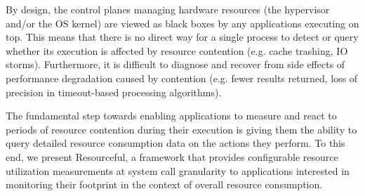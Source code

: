\documentclass[letterpaper,twocolumn,10pt]{article}
\newcommand{\pname}{Resourceful}
\newcommand{\lnote}[1]{\textcolor{red}{[\textit{#1}]}} %
\begin{document}
By design, the control planes managing hardware resources (the hypervisor and/or
the OS kernel) are viewed as black boxes by any applications executing on top.
This means that there is no direct way for a single process to detect or query
whether its execution is affected by resource contention (e.g. cache trashing, IO
storms). Furthermore, it is difficult to diagnose and recover from side effects
of performance degradation caused by contention (e.g. fewer results returned, loss of
precision in timeout-based processing algorithms).



The fundamental step towards enabling applications to measure and react to periods of
resource contention during their execution is giving them the ability to query
detailed resource consumption data on the actions they perform. To this end, we
present \pname, a framework that provides configurable resource utilization
measurements at system call granularity to applications interested in monitoring
their footprint in the context of overall resource consumption.

\end{document}
